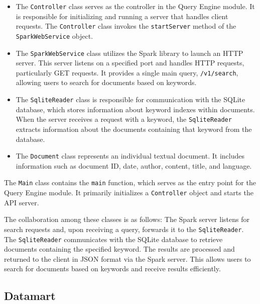 \documentclass{article}
\begin{document}
\begin{itemize}
\item
The \texttt{Controller} class serves as the controller in the Query Engine module. It is responsible for initializing and running a server that handles client requests. The \texttt{Controller} class invokes the \texttt{startServer} method of the \texttt{SparkWebService} object.

\item
The \texttt{SparkWebService} class utilizes the Spark library to launch an HTTP server. This server listens on a specified port and handles HTTP requests, particularly GET requests. It provides a single main query, \texttt{/v1/search}, allowing users to search for documents based on keywords.

\item
The \texttt{SqliteReader} class is responsible for communication with the SQLite database, which stores information about keyword indexes within documents. When the server receives a request with a keyword, the \texttt{SqliteReader} extracts information about the documents containing that keyword from the database.

\item 
The \texttt{Document} class represents an individual textual document. It includes information such as document ID, date, author, content, title, and language.
\end{itemize}


The \texttt{Main} class contains the \texttt{main} function, which serves as the entry point for the Query Engine module. It primarily initializes a \texttt{Controller} object and starts the API server.


The collaboration among these classes is as follows: The Spark server listens for search requests and, upon receiving a query, forwards it to the \texttt{SqliteReader}. The \texttt{SqliteReader} communicates with the SQLite database to retrieve documents containing the specified keyword. The results are processed and returned to the client in JSON format via the Spark server. This allows users to search for documents based on keywords and receive results efficiently.

\subsection{Datamart}
\end{document}
